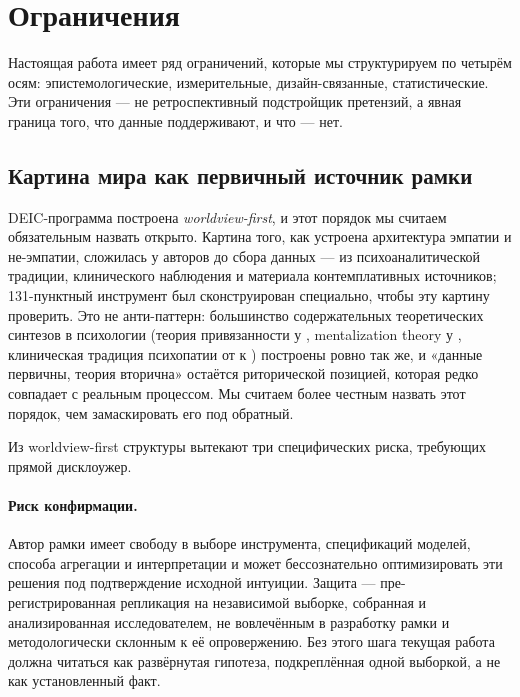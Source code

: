 \section{Ограничения}
\label{sec:limitations}

Настоящая работа имеет ряд ограничений, которые мы структурируем по четырём осям: эпистемологические, измерительные, дизайн-связанные, статистические. Эти ограничения --- не ретроспективный подстройщик претензий, а явная граница того, что данные поддерживают, и что --- нет.

\subsection{Картина мира как первичный источник рамки}
\label{subsec:worldview_first}

DEIC-программа построена \emph{worldview-first}, и этот порядок мы считаем обязательным назвать открыто. Картина того, как устроена архитектура эмпатии и не-эмпатии, сложилась у авторов до сбора данных --- из психоаналитической традиции, клинического наблюдения и материала контемплативных источников; 131-пунктный инструмент был сконструирован специально, чтобы эту картину проверить. Это не анти-паттерн: большинство содержательных теоретических синтезов в психологии (теория привязанности у \citealp{bowlby1969}, mentalization theory у \citealp{fonagy2002}, клиническая традиция психопатии от \citealp{cleckley1941} к \citealp{hare1991}) построены ровно так же, и «данные первичны, теория вторична» остаётся риторической позицией, которая редко совпадает с реальным процессом. Мы считаем более честным назвать этот порядок, чем замаскировать его под обратный.

Из worldview-first структуры вытекают три специфических риска, требующих прямой дисклоужер.

\paragraph{Риск конфирмации.} Автор рамки имеет свободу в выборе инструмента, спецификаций моделей, способа агрегации и интерпретации и может бессознательно оптимизировать эти решения под подтверждение исходной интуиции. Защита --- пре-регистрированная репликация на независимой выборке, собранная и анализированная исследователем, не вовлечённым в разработку рамки и методологически склонным к её опровержению. Без этого шага текущая работа должна читаться как развёрнутая гипотеза, подкреплённая одной выборкой, а не как установленный факт.

